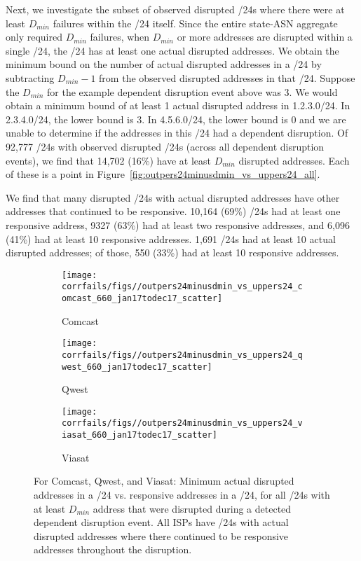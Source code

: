  Next, we investigate the subset of observed disrupted /24s where there
were at least $D_{min}$ failures within the /24 itself. Since the
entire state-ASN aggregate only required $D_{min}$ failures, when
$D_{min}$ or more addresses are disrupted within a single /24, the /24
has at least one actual disrupted addresses. We obtain the minimum bound on
the number of actual disrupted addresses in a /24 by subtracting
$D_{min} - 1$ from the observed disrupted addresses in that /24. Suppose the
$D_{min}$ for the example dependent disruption event above was 3. We would obtain a minimum bound of at least 1
actual disrupted address in 1.2.3.0/24. In 2.3.4.0/24, the lower bound
is 3. In 4.5.6.0/24, the lower bound is 0 and we are unable to
determine if the addresses in this /24 had a dependent disruption. Of 92,777 /24s with observed disrupted /24s (across all dependent
disruption events), we find that 14,702 (16\%) have at least $D_{min}$
disrupted addresses. Each of these is a point in
Figure~\ref{fig:outpers24minusdmin_vs_uppers24_all}.

We find that many disrupted /24s with actual disrupted addresses have other addresses that continued to be responsive. 10,164 (69\%)
/24s had at least one responsive address, 9327 (63\%) had at least two responsive addresses, and 6,096 (41\%) had at least 10
responsive addresses. 1,691 /24s had at least 10 actual disrupted addresses; of those, 550 (33\%) had at least 10
responsive addresses.

\begin{figure*}[t]
  \begin{subfigure}[t]{0.32\linewidth}
    \centering
    \texttt{[image: corrfails/figs//outpers24minusdmin\_vs\_uppers24\_comcast\_660\_jan17todec17\_scatter]}
    \caption{
      \label{fig:outpers24minusdmin_vs_uppers24_comcast}
      Comcast}
  \end{subfigure}
  \hfill
  \begin{subfigure}[t]{0.32\linewidth}
    \centering
    \texttt{[image: corrfails/figs//outpers24minusdmin\_vs\_uppers24\_qwest\_660\_jan17todec17\_scatter]}
    \caption{
      \label{fig:outpers24minusdmin_vs_uppers24_qwest}
      Qwest}
  \end{subfigure}
  \hfill
  \begin{subfigure}[t]{0.32\linewidth}
    \centering
    \texttt{[image: corrfails/figs//outpers24minusdmin\_vs\_uppers24\_viasat\_660\_jan17todec17\_scatter]}
    \caption{
      \label{fig:outpers24minusdmin_vs_uppers24_viasat}
      Viasat}
  \end{subfigure}
  \caption{
  \label{fig:outpers24minusdmin_vs_uppers24_isp}
For Comcast, Qwest, and Viasat: Minimum actual disrupted addresses in a /24 vs. responsive addresses in a /24, for all /24s with
at least $D_{min}$ address that were disrupted during a detected dependent
disruption event. All ISPs have /24s with actual disrupted addresses where there continued to be responsive addresses throughout the disruption.
}
\end{figure*}

